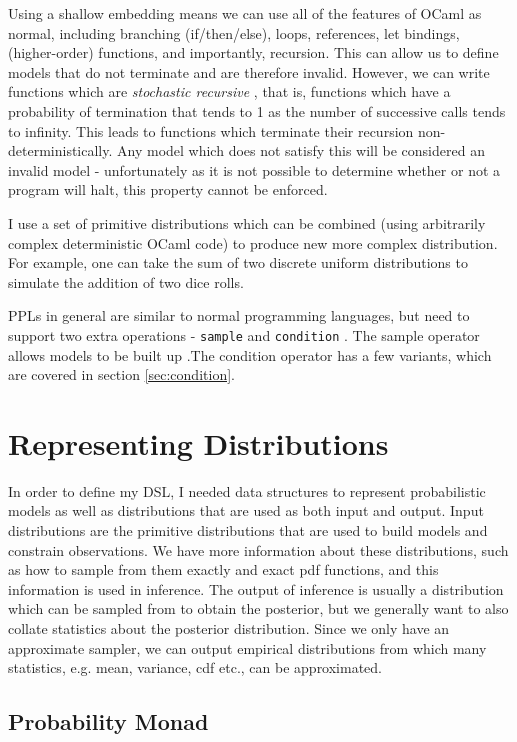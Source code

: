 Using a shallow embedding means we can use all of the features of OCaml as normal, including branching (if/then/else), loops, references, let bindings, (higher-order) functions, and importantly, recursion. This can allow us to define models that do not terminate and are therefore invalid. However, we can write functions which are \textit{stochastic recursive} \cite{siegmund}, that is, functions which have a probability of termination that tends to 1 as the number of successive calls tends to infinity. This leads to functions which terminate their recursion non-deterministically. Any model which does not satisfy this will be considered an invalid model - unfortunately as it is not possible to determine whether or not a program will halt, this property cannot be enforced. 

I use a set of primitive distributions which can be combined (using arbitrarily complex deterministic OCaml code) to produce new more complex distribution. For example, one can take the sum of two discrete uniform distributions to simulate the addition of two dice rolls. 

PPLs in general are similar to normal programming languages, but need to support two extra operations - \texttt{sample} and \texttt{condition} \cite{gordon2014probabilistic}. The sample operator allows models to be built up .The condition operator has a few variants, which are covered in section \ref{sec:condition}.

\section{Representing Distributions}
In order to define my DSL, I needed data structures to represent probabilistic models as well as distributions that are used as both input and output. Input distributions are the primitive distributions that are used to build models and constrain observations. We have more information about these distributions, such as how to sample from them exactly and exact pdf functions, and this information is used in inference. The output of inference is usually a distribution which can be sampled from to obtain the posterior, but we generally want to also collate statistics about the posterior distribution. Since we only have an approximate sampler, we can output empirical distributions from which many statistics, e.g. mean, variance, cdf etc., can be approximated.

\subsection{Probability Monad}

